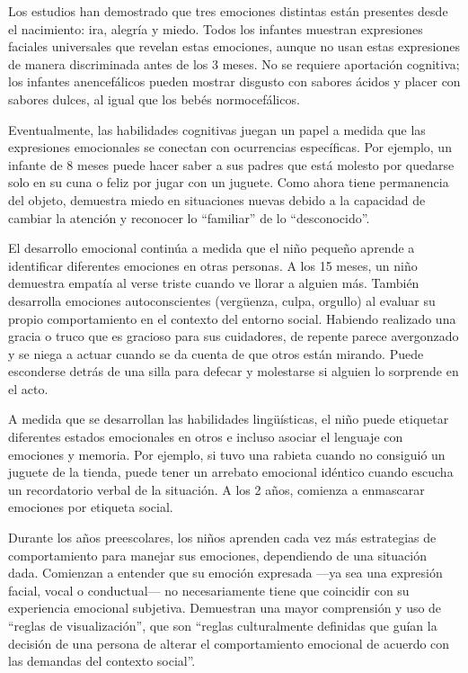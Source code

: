 \documentclass[11pt,letterpaper]{report}
\begin{document}
Los estudios han demostrado que tres emociones distintas están presentes desde
el nacimiento: ira, alegría y miedo. Todos los infantes muestran expresiones
faciales universales que revelan estas emociones, aunque no usan estas
expresiones de manera discriminada antes de los 3 meses. No se requiere
aportación cognitiva; los infantes anencefálicos pueden mostrar disgusto con
sabores ácidos y placer con sabores dulces, al igual que los bebés
normocefálicos. \cite{Gerber2011}

Eventualmente, las habilidades cognitivas juegan un papel a medida que las
expresiones emocionales se conectan con ocurrencias específicas. Por ejemplo,
un infante de 8 meses puede hacer saber a sus padres que está molesto por
quedarse solo en su cuna o feliz por jugar con un juguete. Como ahora tiene
permanencia del objeto, demuestra miedo en situaciones nuevas debido a la
capacidad de cambiar la atención y reconocer lo ``familiar'' de lo
``desconocido''. \cite{Gerber2011}

El desarrollo emocional continúa a medida que el niño pequeño aprende a
identificar diferentes emociones en otras personas. A los 15 meses, un niño
demuestra empatía al verse triste cuando ve llorar a alguien más. También
desarrolla emociones autoconscientes (vergüenza, culpa, orgullo) al evaluar su
propio comportamiento en el contexto del entorno social. Habiendo realizado una
gracia o truco que es gracioso para sus cuidadores, de repente parece
avergonzado y se niega a actuar cuando se da cuenta de que otros están mirando.
Puede esconderse detrás de una silla para defecar y molestarse si alguien lo
sorprende en el acto. \cite{Gerber2011}

A medida que se desarrollan las habilidades lingüísticas, el niño puede
etiquetar diferentes estados emocionales en otros e incluso asociar el lenguaje
con emociones y memoria. Por ejemplo, si tuvo una rabieta cuando no consiguió
un juguete de la tienda, puede tener un arrebato emocional idéntico cuando
escucha un recordatorio verbal de la situación. A los 2 años, comienza a
enmascarar emociones por etiqueta social. \cite{Gerber2011}

Durante los años preescolares, los niños aprenden cada vez más estrategias de
comportamiento para manejar sus emociones, dependiendo de una situación dada.
Comienzan a entender que su emoción expresada —ya sea una expresión facial,
vocal o conductual— no necesariamente tiene que coincidir con su experiencia
emocional subjetiva. Demuestran una mayor comprensión y uso de ``reglas de
visualización'', que son ``reglas culturalmente definidas que guían la decisión
de una persona de alterar el comportamiento emocional de acuerdo con las
demandas del contexto social''. \cite{ZEMAN2006}
\end{document}
